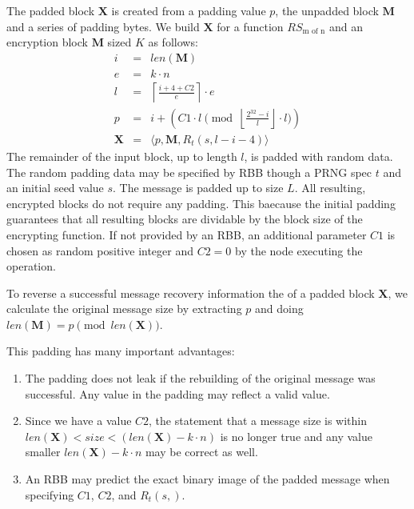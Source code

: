 \documentclass[acmsmall, screen, review]{acmart}
\begin{document}
	The padded block $\mathbf{X}$ is created from a padding value $p$, the unpadded block $\mathbf{M}$ and a series of padding bytes. We build $\mathbf{X}$ for a function $RS_{\text{m of n}}$ and an encryption block $\mathbf{M}$ sized $K$ as follows:
	\begin{eqnarray}
	i          & = & len(\mathbf{M})\\
	e          & = & k \cdot n\\
	l          & = & \left\lceil\frac{i + 4 + C2 }{e}\right\rceil\cdot e\\
	p          & = & i + \left( C1 \cdot l \pmod{\left\lfloor\frac{2^{32}-i}{l}\right\rfloor\cdot l}\right)\\
	\mathbf{X} & = & \langle p,\mathbf{M},R_{t}\left(s,l-i-4\right)\rangle
	\end{eqnarray}    
	The remainder of the input block, up to length $l$, is padded with random data. The random padding data may be specified by RBB though a PRNG spec $t$ and an initial seed value $s$. The message is padded up to size $L$. All resulting, encrypted blocks do not require any padding. This baecause the initial padding guarantees that all resulting blocks are dividable by the block size of the encrypting function. If not provided by an RBB, an additional parameter $C1$ is chosen as random positive integer and $C2=0$  by the node executing the operation.
	
	To reverse a successful message recovery information the of a padded block $\mathbf{X}$, we calculate the original message size by extracting $p$ and doing $len(\mathbf{M})=p \pmod{ len(\mathbf{X})}$.
	
	This padding has many important advantages:
	\begin{enumerate}
		\item The padding does not leak if the rebuilding of the original message was successful. Any value in the padding may reflect a valid value.
		\item Since we have a value $C2$, the statement that a message size is within $len(\mathbf{X})<size<(len(\mathbf{X})-k\cdot n)$ is no longer true and any value smaller $len(\mathbf{X})-k\cdot n$ may be correct as well.
		\item An RBB may predict the exact binary image of the padded message when specifying $C1$, $C2$, and $R_{t}(s,)$.
	\end{enumerate}
	
\end{document}
